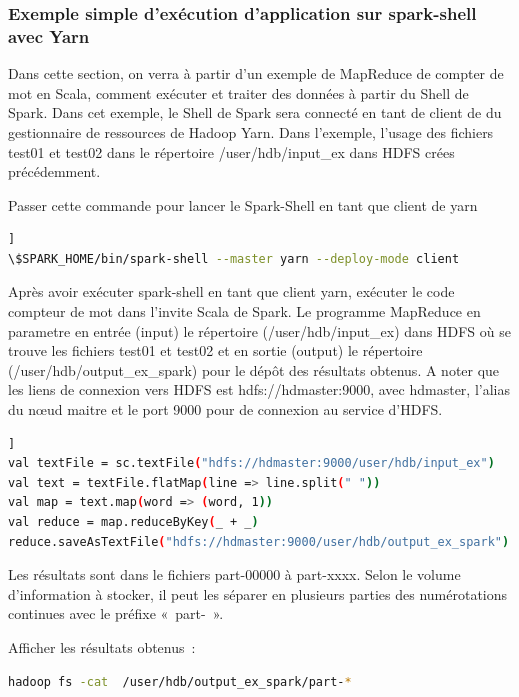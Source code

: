 \documentclass[12pt,french]{book}
\begin{document}
\subsubsection{Exemple simple d’exécution d’application sur spark-shell avec Yarn}

Dans cette section, on verra à partir d’un exemple de MapReduce de compter de mot en Scala, comment exécuter et traiter des données à partir du Shell de Spark.
Dans cet exemple, le Shell de Spark sera connecté en tant de client de du gestionnaire de ressources de Hadoop Yarn.
Dans l’exemple, l’usage des fichiers test01 et test02 dans le répertoire /user/hdb/input\_ex dans HDFS crées précédemment.

Passer cette commande pour lancer le Spark-Shell en tant que client de yarn

\begin{lstlisting}[language=bash, frame=single, breaklines=true, postbreak=\mbox{\textcolor{red}{$\hookrightarrow$}\space}]]
\$SPARK_HOME/bin/spark-shell --master yarn --deploy-mode client
\end{lstlisting}

Après avoir exécuter spark-shell en tant que client yarn, exécuter le code compteur de mot dans l’invite Scala de Spark.
Le programme MapReduce en parametre en entrée (input) le répertoire (/user/hdb/input\_ex) dans HDFS où se trouve les fichiers test01 et test02 et en sortie (output) le répertoire (/user/hdb/output\_ex\_spark) pour le dépôt des résultats obtenus.
A noter que les liens de connexion vers HDFS est hdfs://hdmaster:9000, avec hdmaster, l’alias du nœud maitre et le port 9000 pour de connexion au service d’HDFS.

\begin{lstlisting}[language=bash, frame=single, breaklines=true, postbreak=\mbox{\textcolor{red}{$\hookrightarrow$}\space}]]
val textFile = sc.textFile("hdfs://hdmaster:9000/user/hdb/input_ex")
val text = textFile.flatMap(line => line.split(" "))
val map = text.map(word => (word, 1))
val reduce = map.reduceByKey(_ + _)
reduce.saveAsTextFile("hdfs://hdmaster:9000/user/hdb/output_ex_spark")
\end{lstlisting}

Les résultats sont dans le fichiers part-00000 à part-xxxx.
Selon le volume d’information à stocker, il peut les séparer en plusieurs parties des numérotations continues avec le préfixe « part- ».

Afficher les résultats obtenus :

\begin{lstlisting}[language=bash, frame=single]
hadoop fs -cat  /user/hdb/output_ex_spark/part-*
\end{lstlisting}
\end{document}
